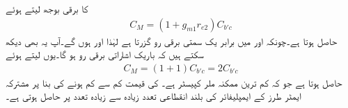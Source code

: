  کا برقی بوجھ  لیتے ہوئے
\begin{align}
C_M=\left(1+g_{m1} r_{e2} \right) C_{b'c}
\end{align}
حاصل ہوتا ہے۔چونکہ  اور  میں برابر یک سمتی برقی رو  گزرتا ہے لہٰذا  اور  ہوں گے۔آپ یہ بھی دیکھ سکتے ہیں کہ باریک اشاراتی برقی رو  ہو گا۔یوں   لیتے ہوئے
\begin{align}
C_M=\left(1+1 \right) C_{b'c}=2 C_{b'c}
\end{align}
حاصل ہوتا ہے جو کہ کم ترین ممکنہ ملر کپیسٹر ہے۔ کی قیمت کم سے کم ہونے کی بنا پر مشترکہ ایمٹر        طرز کے ایمپلیفائر کی  بلند انقطاعی تعدد زیادہ سے زیادہ تعدد پر حاصل ہوتی ہے۔

